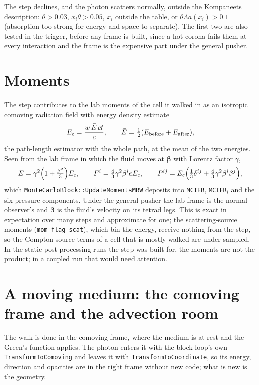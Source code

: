 \documentclass[11pt]{article}
\begin{document}
The step declines, and the photon scatters normally, outside the Kompaneets description:
$\theta>0.03$, $x_i\theta>0.05$, $x_i$ outside the table, or
$\theta\Lambda a(x_i)>0.1$ (absorption too strong for energy and space to separate).  The
first two are also tested in the trigger, before any frame is built, since a hot corona
fails them at every interaction and the frame is the expensive part under the general
pusher.

\section{Moments}
\label{sec:moments}

The step contributes to the lab moments of the cell it walked in as an isotropic
comoving radiation field with energy density estimate
\begin{equation}
  E_c=\frac{w\,\bar E\,ct}{c},\qquad \bar E=\tfrac12(E_{\rm before}+E_{\rm after}),
\end{equation}
the path-length estimator with the whole path, at the mean of the two energies.  Seen
from the lab frame in which the fluid moves at $\boldsymbol\beta$ with Lorentz factor
$\gamma$,
\begin{equation}
  E=\gamma^2\Bigl(1+\tfrac{\beta^2}{3}\Bigr)E_c,\qquad
  F^i=\tfrac43\gamma^2\beta^i cE_c,\qquad
  P^{ij}=E_c\Bigl(\tfrac13\delta^{ij}+\tfrac43\gamma^2\beta^i\beta^j\Bigr),
\end{equation}
which \texttt{MonteCarloBlock::UpdateMomentsMRW} deposits into \texttt{MCIER},
\texttt{MCIFR}$_i$ and the six pressure components.  Under the general pusher the lab
frame is the normal observer's and $\boldsymbol\beta$ is the fluid's velocity on its
tetrad legs.  This is exact in expectation over many steps and approximate for one; the
scattering-source moments (\texttt{mom\_flag\_scat}), which bin the energy, receive
nothing from the step, so the Compton source terms of a cell that is mostly walked are
under-sampled.  In the static post-processing runs the step was built for, the moments
are not the product; in a coupled run that would need attention.

\section{A moving medium: the comoving frame and the advection room}
\label{sec:advection}

The walk is done in the comoving frame, where the medium is at rest and the Green's
function applies.  The photon enters it with the block loop's own
\texttt{TransformToComoving} and leaves it with \texttt{TransformToCoordinate}, so its
energy, direction and opacities are in the right frame without new code; what is new is
the geometry.
\end{document}
